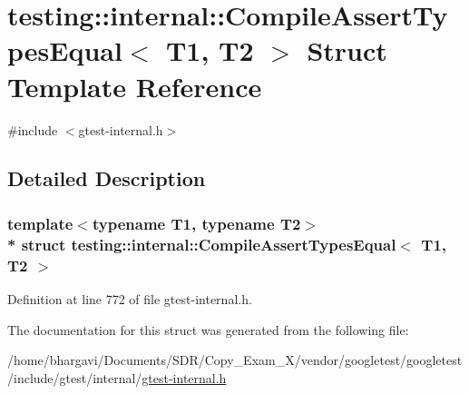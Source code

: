 \hypertarget{structtesting_1_1internal_1_1_compile_assert_types_equal}{}\section{testing\+:\+:internal\+:\+:Compile\+Assert\+Types\+Equal$<$ T1, T2 $>$ Struct Template Reference}
\label{structtesting_1_1internal_1_1_compile_assert_types_equal}


{\ttfamily \#include $<$gtest-\/internal.\+h$>$}



\subsection{Detailed Description}
\subsubsection*{template$<$typename T1, typename T2$>$\\*
struct testing\+::internal\+::\+Compile\+Assert\+Types\+Equal$<$ T1, T2 $>$}



Definition at line 772 of file gtest-\/internal.\+h.



The documentation for this struct was generated from the following file\+:\begin{DoxyCompactItemize}
\item 
/home/bhargavi/\+Documents/\+S\+D\+R/\+Copy\+\_\+\+Exam\+\_\+X/vendor/googletest/googletest/include/gtest/internal/\hyperlink{gtest-internal_8h}{gtest-\/internal.\+h}\end{DoxyCompactItemize}
